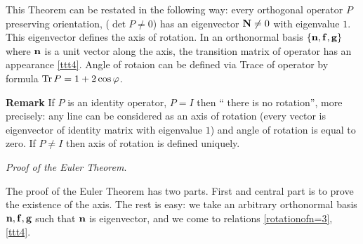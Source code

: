 \documentclass[12pt]{article}
\numberwithin{equation}{section}
\begin{document}
\smallskip

This Theorem can be restated in the following way:
every orthogonal operator
$P$ preserving orientation, ($\det P\not=0$) has an eigenvector ${\bf N}\not=0$
with eigenvalue $1$. This eigenvector defines the axis of rotation.
In an orthonormal basis $\{{\bf n},{\bf f},{\bf g}\}$ where ${\bf n}$ is a unit vector
along the axis, the transition matrix of operator has an appearance
\eqref{ttt4}. Angle of rotaion can be defined via Trace of operator
by formula $ {\rm Tr\,}P=1+2\cos\varphi$.

{\bf Remark} If $P$ is an identity operator, $P=I$  then 
`` there is no rotation'', more precisely:
any line can be considered as an axis of rotation (every vector 
is eigenvector of identity matrix
with eigenvalue $1$) and angle of rotation is equal to zero.
If $P\not=I$ then axis of rotation is defined uniquely.




\smallskip

  {\sl Proof of the Euler Theorem}.

The proof of the Euler Theorem has two parts. First and central part
  is to prove the existence of the axis.
  The rest is easy: 
we take an arbitrary orthonormal
basis
  ${{\bf n},{\bf f},{\bf g}}$ such that ${\bf n}$ is eigenvector,
and we come to relations  \eqref{rotationofn=3}, \eqref{ttt4}.
\end{document}
